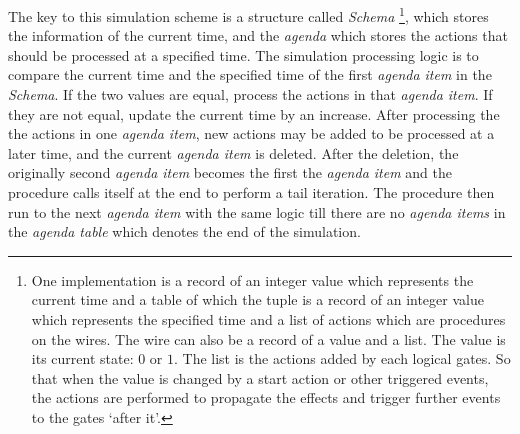 \documentclass[12pt,a4paper]{report}
\begin{document}
        The key to this simulation scheme is a structure called \emph{Schema} \footnote{One implementation is a record of an integer value which represents the current time and a table of which the tuple is a record of an integer value which represents the specified time and a list of actions which are procedures on the wires. The wire can also be a record of a value and a list. The value is its current state: $0$ or $1$. The list is the actions added by each logical gates. So that when the value is changed by a start action or other triggered events, the actions are performed to propagate the effects and trigger further events to the gates `after it'.}, which stores the information of the current time, and the \emph{agenda} which stores the actions that should be processed at a specified time. The simulation processing logic is to compare the current time and the specified time of the first \emph{agenda item} in the \emph{Schema}. If the two values are equal, process the actions in that \emph{agenda item}. If they are not equal, update the current time by an increase. After processing the the actions in one \emph{agenda item}, new actions may be added to be processed at a later time, and the current \emph{agenda item} is deleted. After the deletion, the originally second \emph{agenda item} becomes the first the \emph{agenda item} and the procedure calls itself at the end to perform a tail iteration. The procedure then run to the next \emph{agenda item} with the same logic till there are no \emph{agenda items} in the \emph{agenda table} which denotes the end of the simulation.
\end{document}
